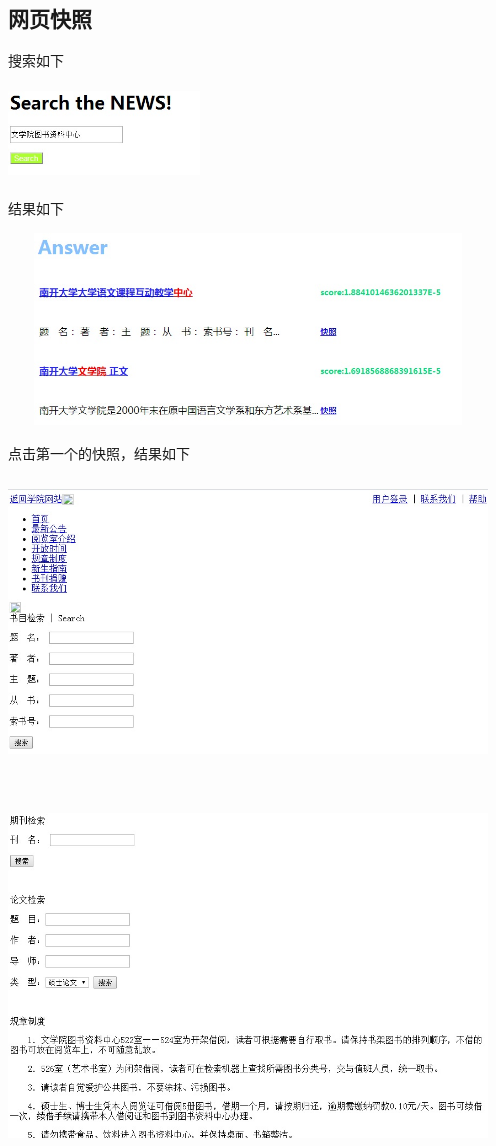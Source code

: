 ﻿\documentclass[UTF8]{ctexart}
\begin{document}
\begin{flushleft}
\subsection{网页快照}
搜索如下
\par{}
\includegraphics[width=2.00in,height=1.00in]{32.jpg}
\par{}
结果如下
\par{}
\includegraphics[width=5.00in,height=2.00in]{33.jpg}
\par{}
点击第一个的快照，结果如下
\par{}
\includegraphics[width=5.00in,height=3.00in]{34.jpg}
\par{}
\includegraphics[width=5.00in,height=4.00in]{35.jpg}

\end{flushleft}
\end{document}
